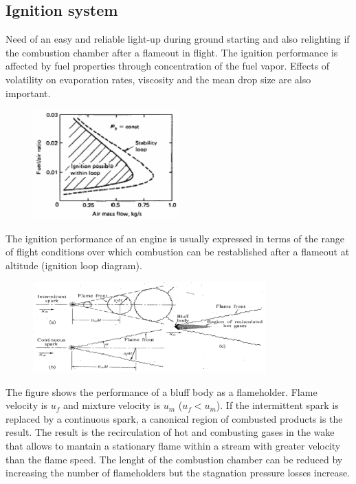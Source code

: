 \documentclass[12pt]{article}
\begin{document}
\subsection{Ignition system}

Need of an easy and reliable light-up during ground starting and also relighting if the combustion chamber after a flameout in flight. The ignition performance is affected by fuel properties through concentration of the fuel vapor. Effects of volatility on evaporation rates, viscosity and the mean drop size are also important.

\begin{figure}[h!]
\centering
\includegraphics[width=0.5\textwidth]{figures/ignitionloop.png}
\end{figure}

The ignition performance of an engine is usually expressed in terms of the range of flight conditions over which combustion can be restablished after a flameout at altitude (ignition loop diagram).

\begin{figure}[h!]
\centering
\includegraphics[width=0.8\textwidth]{figures/flameholder.png}
\end{figure}

The figure shows the performance of a bluff body as a flameholder. Flame velocity is $u_{f}$ and mixture velocity is $u_{m}$ ($u_{f}<u_{m}$). If the intermittent spark is replaced by a continuous spark, a canonical region of combusted products is the result. The result is the recirculation of hot and combusting gases in the wake that allows to mantain a stationary flame within a stream with greater velocity than the flame speed. The lenght of the combustion chamber can be reduced by increasing the number of flameholders but the stagnation pressure losses increase.
\end{document}
